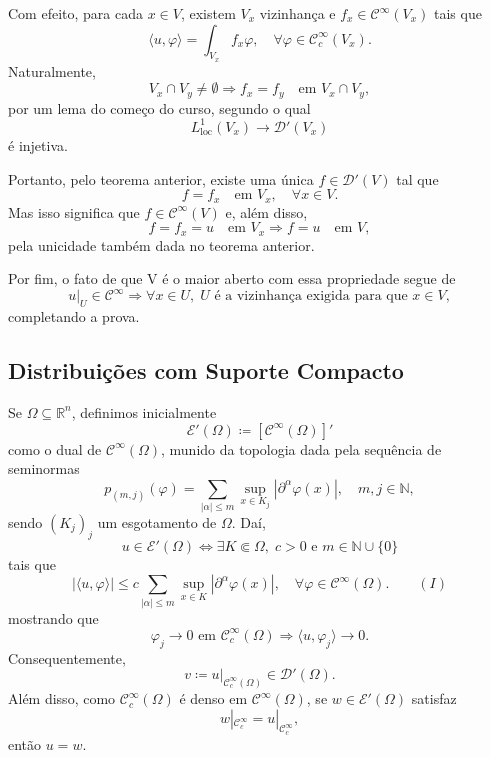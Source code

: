 \documentclass[../distribution_theory_notes.tex]{subfiles}
\begin{document}
Com efeito, para cada \(x\in V\), existem \(V_{x}\) vizinhança e \(f_{x}\in \mathcal{C}^{\infty}(V_{x})\) tais que
\[
	\langle u,\varphi \rangle=\int_{V_{x}}f_{x}\varphi ,\quad \forall \varphi \in \mathcal{C}_{c}^{\infty}(V_{x}).
\]
Naturalmente,
\[
	V_{x}\cap V_{y}\neq \emptyset \Rightarrow f_{x}=f_{y}\quad \text{em }V_{x}\cap V_{y},
\]
por um lema do começo do curso, segundo o qual
\[
	L_{\mathrm{loc}}^{1}(V_{x})\longrightarrow \mathcal{D}'(V_{x})
\]
é injetiva.

Portanto, pelo teorema anterior, existe uma única \(f\in \mathcal{D}'(V)\) tal que
\[
	f=f_{x}\quad \text{em }V_{x},\quad \forall x\in V.
\]
Mas isso significa que \(f\in \mathcal{C}^{\infty}(V)\) e, além disso,
\[
	f=f_{x}=u\quad \text{em }V_{x}\Rightarrow f=u\quad \text{em }V,
\]
pela unicidade também dada no teorema anterior.

Por fim, o fato de que V é o maior aberto com essa propriedade segue de
\[
	u|_{U}\in \mathcal{C}^{\infty}\Rightarrow \forall x\in U,\; U\text{ é a vizinhança exigida para que }x\in V,
\]
completando a prova.

\subsection{Distribuições com Suporte Compacto}
Se \(\Omega \subseteq \mathbb{R}^{n}\), definimos inicialmente
\[
	\mathcal{E}'(\Omega )\coloneqq [\mathcal{C}^{\infty}(\Omega )]'
\]
como o dual de \(\mathcal{C}^{\infty}(\Omega )\), munido da topologia dada pela sequência de seminormas
\[
	p_{(m,j)}(\varphi )=\sum\limits_{|\alpha |\leq m}\sup_{x\in K_{j}}|\partial^{\alpha }\varphi (x)|,\quad m,j\in \mathbb{N},
\]
sendo \((K_{j})_{j}\) um esgotamento de \(\Omega \). Daí,
\[
	u\in \mathcal{E}'(\Omega )\Longleftrightarrow\exists K\Subset \Omega,\; c>0\text{ e }m\in \mathbb{N}\cup \{0\}
\]
tais que
\[
	|\langle u,\varphi \rangle|\leq c\sum\limits_{|\alpha |\leq m}\sup_{x\in K}|\partial^{\alpha }\varphi (x)|,\quad \forall \varphi \in \mathcal{C}^{\infty}(\Omega ).\qquad (I)
\]
mostrando que
\[
	\varphi _{j}\longrightarrow 0\text{ em }\mathcal{C}_{c}^{\infty}(\Omega )	\Rightarrow \langle u,\varphi _{j}\rangle\longrightarrow 0.
\]
Consequentemente,
\[
	v\coloneqq u|_{\mathcal{C}_{c}^{\infty}(\Omega )}\in \mathcal{D}'(\Omega ).
\]
Além disso, como \(\mathcal{C}_{c}^{\infty}(\Omega )\) é denso em \(\mathcal{C}^{\infty}(\Omega )\), se \(w\in \mathcal{E}'(\Omega )\) satisfaz
\[
	w|_{\mathcal{C}_{c}^{\infty}}=u|_{\mathcal{C}_{c}^{\infty}},
\]
então \(u=w\).
\end{document}
